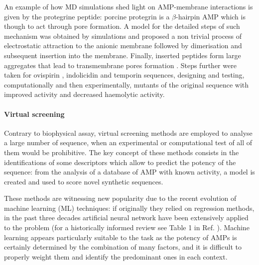 An example of how MD simulations shed light on AMP-membrane interactions is given by the protegrine peptide: porcine protegrin is a $\beta$-hairpin AMP which is though to act through pore formation. A model for the detailed steps of such mechanism was obtained by simulations and proposed a non trivial process of electrostatic attraction to the anionic membrane followed by dimeri­sation and subsequent insertion into the membrane. Finally, inserted peptides form large aggregates that lead to transmem­brane pores formation \cite{Bolintineanu2011}.
Steps further were taken for ovispirin \cite{Khandelia2005}, indolicidin \cite{Tsai2009} and temporin \cite{Farrotti2017} sequences, designing and testing, computationally and then experimentally, mutants of the original sequence with improved activity and decreased haemolytic activity.


\paragraph{Virtual screening}
Contrary to biophysical assay, virtual screening methods are employed to analyse a large number of sequence, when an experimental or computational test of all of them would be prohibitive. The key concept of these methods consists in the identifications of some descriptors which allow to predict the potency of the sequence: from the analysis of a database of AMP with known activity, a model is created and used to score novel synthetic sequences.

These methods are witnessing new popularity due to the recent evolution of machine learning (ML) techniques: if originally they relied on regression methods, in the past three decades artificial neural network have been extensively applied to the problem (for a historically informed review see Table 1 in Ref. \cite{Fjell2011}). Machine learning appears particularly suitable to the task as the potency of AMPs is certainly determined by the combination of many factors, and it is difficult to properly weight them and identify the predominant ones in each context.

